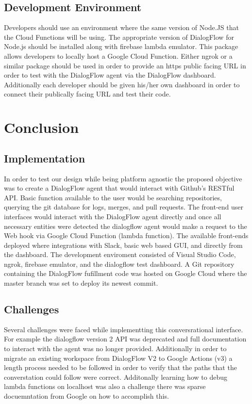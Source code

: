 \documentclass[9pt,software]{livecoms}
\begin{document}
\subsection{Development Environment}
Developers should use an environment where the same version of Node.JS that the Cloud Functions will be using. The appropriate version of DialogFlow for Node.js should be installed along with firebase lambda emulator.
This package allows developers to locally host a Google Cloud Function. Either ngrok or a similar package should be used in order to provide an https public facing URL in order to test with the DialogFlow 
agent via the DialogFlow dashboard. Additionally each developer should be given his/her own dashboard in order to connect their publically facing URL and test their code.

\section{Conclusion}
\subsection{Implementation}
In order to test our design while being platform agnostic the proposed objective was to create a DialogFlow agent that would interact with Github's RESTful API. Basic function available to the user would be searching
repositories, querying the git database for logs, merges, and pull requests. The front-end user interfaces would interact with the DialogFlow agent directly and once all necessary entities were detected the dialogflow agent
would make a request to the Web hook via Google Cloud Function (lambda function). The available front-ends deployed where integrations with Slack, basic web based GUI, and directly from the dashboard. The development enviroment 
consisted of Visual Studio Code, ngrok, firebase emulator, and the dialogflow test dashboard. A Git repository containing the DialogFlow fufillment code was hosted on Google Cloud where the master branch was set to deploy its newest commit.

\subsection{Challenges}
Several challenges were faced while implementting this conversrational interface. For example the dialogflow version 2 API was deprecated and full documentation to interact with the agent was no longer provided. Additionally in order to migrate
an existing workspace from DialogFlow V2 to Google Actions (v3) a length process needed to be followed in order to verify that the paths that the converstation could follow were correct. Additonally learning how to debug lambda functions on localhost 
was also a challenge there was sparse docuemntation from Google on how to accomplish this. 
\end{document}

